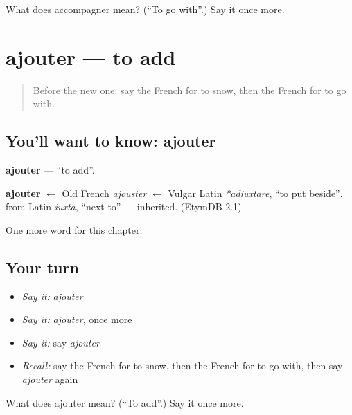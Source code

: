 \begin{tcolorbox}[breakable,colback=teal!4,colframe=teal!35!black,title={Before you move on}]
What does accompagner mean? (\textquotedblleft{}To go with\textquotedblright{}.) Say it once more.
\end{tcolorbox}
\section[ajouter]{ajouter — to add}

\label{lesson:FR-C178-ajouter}



\begin{quote}
Before the new one: say the French for to snow, then the French for to go with.
\end{quote}

\subsection*{You'll want to know: ajouter}
\textbf{ajouter} — \textquotedblleft{}to add\textquotedblright{}.

\begin{cousinweb}
\textbf{ajouter} $\leftarrow$ Old French \emph{ajouster} $\leftarrow$ Vulgar Latin \emph{*adiuxtare}, \textquotedblleft{}to put beside\textquotedblright{}, from Latin \emph{iuxta}, \textquotedblleft{}next to\textquotedblright{} — inherited. (EtymDB 2.1)
\end{cousinweb}

\begin{grammarlens}[title={What you've built}]
One more word for this chapter.
\end{grammarlens}

\subsection*{Your turn}
\begin{itemize}
\raggedright
  \item \emph{Say it:} \emph{ajouter}
  \item \emph{Say it:} \emph{ajouter}, once more
  \item \emph{Say it:} say \emph{ajouter}
  \item \emph{Recall:} say the French for to snow, then the French for to go with, then say \emph{ajouter} again
\end{itemize}

\begin{tcolorbox}[breakable,colback=teal!4,colframe=teal!35!black,title={Before you move on}]
What does ajouter mean? (\textquotedblleft{}To add\textquotedblright{}.) Say it once more.
\end{tcolorbox}
